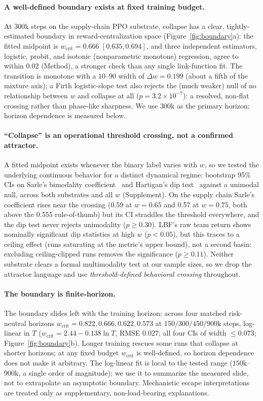 \documentclass[letterpaper]{article} %
\theoremstyle{plain}
\newcommand{\wcrit}{w_{\mathrm{crit}}}
\begin{document}
\paragraph{A well-defined boundary exists at fixed training budget.}
At 300k steps on the supply-chain PPO substrate, collapse has a clear, tightly-estimated boundary in
reward-centralization space (Figure~\ref{fig:boundary}a): the fitted midpoint is $\wcrit=0.666$
$[0.635,0.694]$, and three
independent estimators, logistic, probit, and isotonic (nonparametric monotone) regression, agree to
within $0.02$ (Method), a stronger check than any single link-function fit. The transition is
monotone with a $10$--$90$ width of $\Delta w=0.199$ (about a fifth of the mixture axis); a Firth
logistic-slope test also rejects the (much weaker) null of no relationship between $w$ and collapse
at all ($p=3.2\times10^{-7}$): a resolved, non-flat crossing rather than
phase-like sharpness. We use 300k as the primary horizon; horizon dependence is measured below.

\paragraph{``Collapse'' is an operational threshold crossing, not a confirmed attractor.}
A fitted midpoint exists whenever the binary label varies with $w$, so we tested the underlying
continuous behavior for a distinct dynamical regime: bootstrap 95\% CIs on Sarle's bimodality
coefficient~\citep{sarle1983cluster} and Hartigan's dip test~\citep{hartigan1985dip} against a
unimodal null, across both substrates and all $w$ (Supplement). On the supply chain Sarle's coefficient
rises near the crossing (0.59 at $w{=}0.65$ and 0.57 at $w{=}0.75$, both above the 0.555 rule-of-thumb)
but its CI straddles the threshold
everywhere, and the dip test never rejects unimodality ($p\ge0.30$). LBF's raw team return shows
nominally significant dip statistics at high $w$ ($p<0.05$), but this traces to a ceiling effect (runs
saturating at the metric's upper bound), not a second basin: excluding ceiling-clipped runs removes
the significance ($p\ge0.11$). Neither substrate clears a formal multimodality test at our sample
sizes, so we drop the attractor language and use \emph{threshold-defined behavioral crossing}
throughout.

\paragraph{The boundary is finite-horizon.}
The boundary slides left with the training horizon: across four matched risk-neutral horizons
$\wcrit=0.822,0.666,0.622,0.573$ at $150/300/450/900\mathrm{k}$ steps, log-linear in $T$
($\wcrit=2.44-0.138\ln T$, RMSE $0.027$; all four CIs of width ${\le}0.073$; Figure~\ref{fig:boundary}b).
Longer training rescues some runs that collapse at shorter horizons; at any fixed budget $\wcrit$ is
well-defined, so horizon dependence does not make it arbitrary. The log-linear fit is local to the
tested range ($150$k--$900$k, a single
order of magnitude); we use it to summarize the measured slide, not to extrapolate an asymptotic
boundary. Mechanistic escape interpretations are treated only as supplementary, non-load-bearing
explanations.
\end{document}
